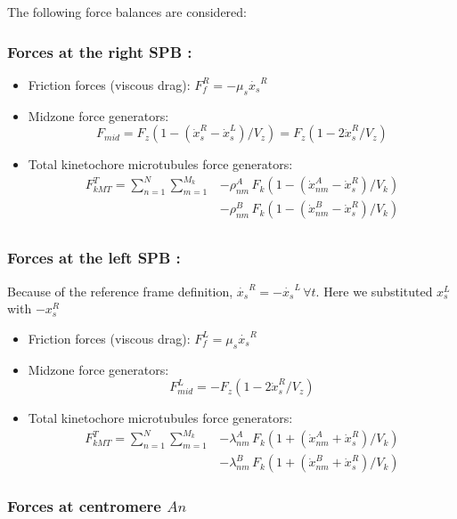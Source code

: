 \documentclass[a4paper,12pt]{article}
\begin{document}
The following force balances are considered:

\subsubsection{Forces at the right SPB :}
\begin{itemize}
\item Friction forces (viscous drag):  $F_f^R = -\mu_s \dot{x_s}^R$
\item Midzone force generators: 
  $$F_{mid} = F_z\left(1 - (\dot{x}^R_s - \dot{x}_s^L)/V_z\right) =
  F_z\left(1 - 2\dot{x}^R_s / V_z\right) $$
\item Total kinetochore microtubules force generators:
 $$ \begin{aligned}
    F_{kMT}^T = \sum_{n = 1}^{N}\sum_{m = 1}^{M_k} & - \rho_{nm}^A\,F_k\left( 1 -
      (\dot{x}^A_{nm} - \dot{x}^R_s)/V_k\right)\\
    & - \rho_{nm}^B\,F_k\left( 1 -
      (\dot{x}^B_{nm} - \dot{x}^R_s)/V_k\right)\\
 \end{aligned} $$
\end{itemize}

\subsubsection{Forces at the left SPB :}

Because of the reference frame definition, $\dot{x_s}^R =
-\dot{x_s}^L\,\forall t$. Here we substituted $x_s^L$ with $-x_s^R$
\begin{itemize}
\item Friction forces (viscous drag):  $F_f^L = \mu_s \dot{x_s}^R$
\item Midzone force generators: 
  $$F_{mid}^L = - F_z\left(1 - 2\dot{x}^R_s / V_z\right) $$
\item Total kinetochore microtubules force generators:
$$  \begin{aligned}
    F_{kMT}^T = \sum_{n = 1}^{N}\sum_{m = 1}^{M_k} & - \lambda_{nm}^A\,F_k\left(1 +
      (\dot{x}^A_{nm} + \dot{x}^R_s)/V_k\right)\\
    & - \lambda_{nm}^B\,F_k\left(1 +
      (\dot{x}^B_{nm} + \dot{x}^R_s)/V_k\right)
  \end{aligned}
$$
\end{itemize}


\subsubsection{Forces at centromere $An$}
\end{document}
